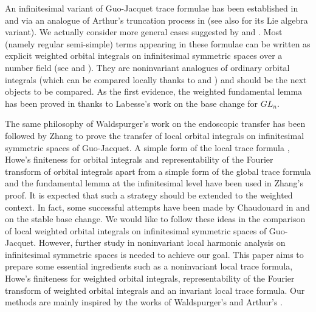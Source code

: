 \documentclass[a4paper]{amsart}
\theoremstyle{definition}
\theoremstyle{remark}
\numberwithin{equation}{subsection}
\begin{document}
An infinitesimal variant of Guo-Jacquet trace formulae has been established in \cite{zbMATH07499568} and \cite{MR4350885} via an analogue of Arthur's truncation process in \cite{MR518111} (see also \cite{MR1893921} for its Lie algebra variant). We actually consider more general cases suggested by \cite{MR3299843} and \cite{MR2806111}. Most (namely regular semi-simple) terms appearing in these formulae can be written as explicit weighted orbital integrals on infinitesimal symmetric spaces over a number field (see \cite[Theorem 9.2]{zbMATH07499568} and \cite[Theorem 9.2]{MR4350885}). They are noninvariant analogues of ordinary orbital integrals (which can be compared locally thanks to \cite{MR1382478} and \cite{MR3414387}) and should be the next objects to be compared. As the first evidence, the weighted fundamental lemma has been proved in \cite[Theorem 10.9]{MR4350885} thanks to Labesse's work \cite{MR1339717} on the base change for $GL_n$. 

The same philosophy of Waldspurger's work \cite{MR1440722} on the endoscopic transfer has been followed by Zhang \cite{MR3414387} to prove the transfer of local orbital integrals on infinitesimal symmetric spaces of Guo-Jacquet. A simple form of the local trace formula \cite[Lemma 6.5]{MR3414387}, Howe's finiteness for orbital integrals \cite[Theorem 6.1]{MR1375304} and representability of the Fourier transform of orbital integrals \cite[Theorem 6.1]{MR3414387} apart from a simple form of the global trace formula \cite[Theorem 8.4 and p. 1875]{MR3414387} and the fundamental lemma \cite[Lemma 5.18]{MR3414387} at the infinitesimal level have been used in Zhang's proof. It is expected that such a strategy should be extended to the weighted context. In fact, some successful attempts have been made by Chaudouard in \cite{MR2164623} and \cite{MR2332352} on the stable base change. We would like to follow these ideas in the comparison of local weighted orbital integrals on infinitesimal symmetric spaces of Guo-Jacquet. However, further study in noninvariant local harmonic analysis on infinitesimal symmetric spaces is needed to achieve our goal. This paper aims to prepare some essential ingredients such as a noninvariant local trace formula, Howe's finiteness for weighted orbital integrals, representability of the Fourier transform of weighted orbital integrals and an invariant local trace formula. Our methods are mainly inspired by the works of Waldspurger's \cite{MR1344131} and Arthur's \cite{MR1114210}. 
\end{document}
